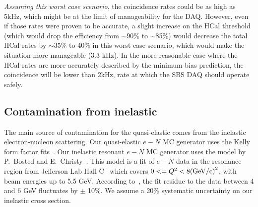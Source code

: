 {\em Assuming this worst case scenario}, the coincidence rates could be as high as 5kHz, which might be at the limit of manageability for the DAQ.
However, even if those rates were proven to be accurate, a slight increase on the HCal threshold (which would drop the efficiency from $\sim$90\% to $\sim$85\%) would decrease the total HCal rates by $\sim$35\% to 40\% in this worst case scenario, which would make the situation more manageable (3.3 kHz).
In the more reasonable case where the HCal rates are more accurately described by the minimum bias prediction, the coincidence will be lower than 2kHz, rate at which the SBS DAQ should operate safely.
  
  
\subsection{Contamination from inelastic}\label{sec:inel_contam}

The main source of contamination for the quasi-elastic comes from the inelastic electron-nucleon scattering.
Our quasi-elastic $e-N$ MC generator uses the Kelly form factor fits~\cite{}. %
Our inelastic resonant $e-N$ MC generator uses the model by P.~Bosted and E.~Christy~\cite{}. %
This model is a fit of $e-N$ data in the resonance region from Jefferson Lab Hall C~\cite{}
which covers $0<=Q^2<8 {\rm (GeV/c)}^2$, with beam energies up to 5.5 GeV.
According to~\cite{}, %
the fit residue to the data between 4 and 6 GeV fluctuates by $\pm$ 10\%. We assume a 20\% systematic uncertainty on our inelastic cross section. %

